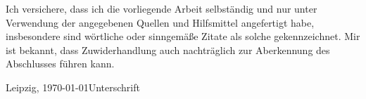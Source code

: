 
\vspace*{\fill}
\begin{center}
Ich versichere, dass ich die vorliegende Arbeit selbständig und nur unter  Verwendung der angegebenen Quellen und Hilfsmittel angefertigt habe, insbesondere sind wörtliche oder sinngemäße Zitate als solche gekennzeichnet. Mir ist bekannt, dass Zuwiderhandlung auch nachträglich zur Aberkennung des Abschlusses führen kann.

\vspace{3cm}

Leipzig, \today \hfill Unterschrift
\end{center}
\vspace*{\fill}
\vspace*{\fill}
\vspace*{\fill}
